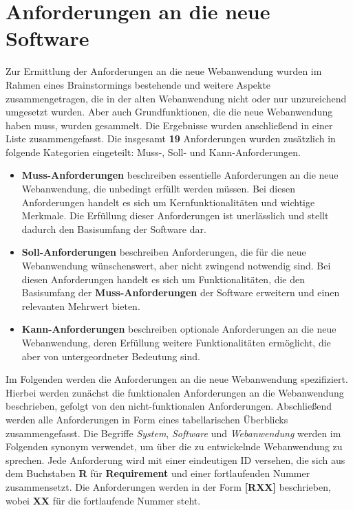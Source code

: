 
\chapter{Anforderungen an die neue Software}
\label{chapter:5}

Zur Ermittlung der Anforderungen an die neue Webanwendung wurden im Rahmen eines Brainstormings bestehende und weitere Aspekte zusammengetragen, die in der alten Webanwendung nicht oder nur unzureichend umgesetzt wurden. Aber auch Grundfunktionen, die die neue Webanwendung haben muss, wurden gesammelt. Die Ergebnisse wurden anschließend in einer Liste zusammengefasst. Die insgesamt \textbf{19} Anforderungen wurden zusätzlich in folgende Kategorien eingeteilt: Muss-, Soll- und Kann-Anforderungen.

\begin{itemize}
    \item \textbf{Muss-Anforderungen} beschreiben essentielle Anforderungen an die neue Webanwendung, die unbedingt erfüllt werden müssen. Bei diesen Anforderungen handelt es sich um Kernfunktionalitäten und wichtige Merkmale. Die Erfüllung dieser Anforderungen ist unerlässlich und stellt dadurch den Basisumfang der Software dar.

    \item \textbf{Soll-Anforderungen} beschreiben Anforderungen, die für die neue Webanwendung wünschenswert, aber nicht zwingend notwendig sind. Bei diesen Anforderungen handelt es sich um Funktionalitäten, die den Basisumfang der \textbf{Muss-Anforderungen} der Software erweitern und einen relevanten Mehrwert bieten.

    \item \textbf{Kann-Anforderungen} beschreiben optionale Anforderungen an die neue Webanwendung, deren Erfüllung weitere Funktionalitäten ermöglicht, die aber von untergeordneter Bedeutung sind.
\end{itemize}

Im Folgenden werden die Anforderungen an die neue Webanwendung spezifiziert. Hierbei werden zunächst die funktionalen Anforderungen an die Webanwendung beschrieben, gefolgt von den nicht-funktionalen Anforderungen. Abschließend werden alle Anforderungen in Form eines tabellarischen Überblicks zusammengefasst. Die Begriffe \textit{System}, \textit{Software} und \textit{Webanwendung} werden im Folgenden synonym verwendet, um über die zu entwickelnde Webanwendung zu sprechen. Jede Anforderung wird mit einer eindeutigen ID versehen, die sich aus dem Buchstaben \textbf{R} für \textbf{Requirement} und einer fortlaufenden Nummer zusammensetzt. Die Anforderungen werden in der Form \textbf{[RXX]} beschrieben, wobei \textbf{XX} für die fortlaufende Nummer steht.

